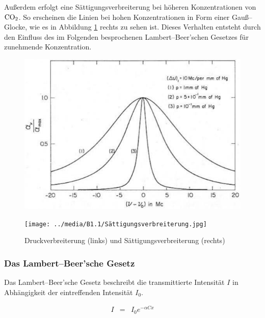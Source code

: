 \documentclass[12pt,a4paper]{scrartcl}
\numberwithin{equation}{section} %
\begin{document}
	Außerdem erfolgt eine Sättigungsverbreiterung bei höheren Konzentrationen von $\ce{CO_2}$. So erscheinen die Linien bei hohen Konzentrationen in Form einer Gauß--Glocke, wie es in Abbildung \ref{abb:Druckverbreiterung & Sättigungsverbreiterung} rechts zu sehen ist. Dieses Verhalten entsteht durch den Einfluss des im Folgenden besprochenen Lambert--Beer'schen Gesetzes für zunehmende Konzentration.
	
	\begin{figure}[h]
		\centering
		\begin{minipage}{0.49\textwidth}
			\includegraphics[width=\textwidth]{../media/B1.1/Druckverbreiterung.jpg}
		\end{minipage}
		\begin{minipage}{0.49\textwidth}
			\texttt{[image: ../media/B1.1/Sättigungsverbreiterung.jpg]}
		\end{minipage}
		\caption{Druckverbreiterung (links) und Sättigungsverbreiterung (rechts) \cite{UzK}}
		\label{abb:Druckverbreiterung & Sättigungsverbreiterung}
	\end{figure}
	
	\hypertarget{das-lambertbeersche-gesetz}{\subsubsection{Das Lambert--Beer'sche Gesetz}\label{das-lambertbeersche-gesetz}}
	Das Lambert--Beer'sche Gesetz beschreibt die transmittierte Intensität $I$ in Abhängigkeit der eintreffenden Intensität $I_0$. \cite{HakenWolf} %
	
	\begin{eqnarray}
		I &=& I_0 e^{- \alpha C x} \label{eq:Lambert-Beer}
	\end{eqnarray}
	
\end{document}
